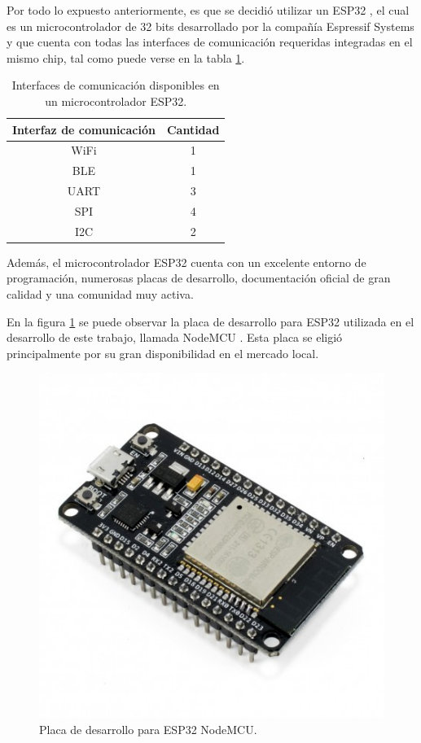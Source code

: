 Por todo lo expuesto anteriormente, es que se decidió utilizar un ESP32 \citep{esp32_overview}, el cual es un microcontrolador de 32 bits desarrollado por la compañía Espressif Systems y que cuenta con todas las interfaces de comunicación requeridas integradas en el mismo chip, tal como puede verse en la tabla \ref{tab:esp32_interfaces}.

\begin{table}[h]
	\centering
	\caption{Interfaces de comunicación disponibles en un microcontrolador ESP32.}
	\begin{tabular}{c c}    
		\toprule
		\textbf{Interfaz de comunicación}	& \textbf{Cantidad}	\\
		\midrule
		WiFi								& 1					\\
		BLE									& 1					\\
		UART 								& 3					\\		
		SPI	 								& 4					\\
		I2C	 								& 2					\\
		\bottomrule
		\hline
	\end{tabular}
	\label{tab:esp32_interfaces}
\end{table}

Además, el microcontrolador ESP32 cuenta con un excelente entorno de programación, numerosas placas de desarrollo, documentación oficial de gran calidad y una comunidad muy activa.

En la figura \ref{fig:nodemcu_esp32} se puede observar la placa de desarrollo para ESP32 utilizada en el desarrollo de este trabajo, llamada NodeMCU \citep{esp32_nodemcu}. Esta placa se eligió principalmente por su gran disponibilidad en el mercado local.

\begin{figure}[h]
\centering
\includegraphics[scale=0.4]{./Figures/nodemcu_esp32.jpg}
\caption[Placa de desarrollo para ESP32 NodeMCU.]{Placa de desarrollo para ESP32 NodeMCU.\footnotemark}
\label{fig:nodemcu_esp32}
\end{figure}

